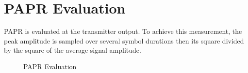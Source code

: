 \section{\gls{PAPR} Evaluation}
\gls{PAPR} is evaluated at the transmitter output. To achieve this measurement, the peak amplitude is sampled over several symbol durations then its square divided by the square of the average signal amplitude.
\begin{figure}[htpb!]
	\centerline{\resizebox{10cm}{!}{}}
	\caption{\gls{PAPR} Evaluation}
	\label{fig:papr_blk_meth}
\end{figure}